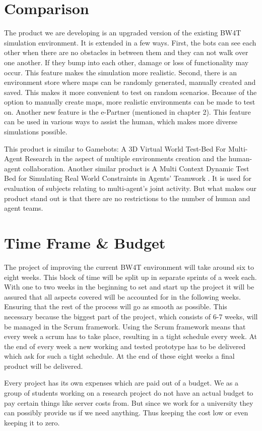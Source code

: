 \documentclass[oneside]{tudelft-report}
\begin{document}
\chapter{Comparison}
The product we are developing is an upgraded version of the existing BW4T simulation environment. It is extended in a few ways. First, the bots can see each other when there are no obstacles in between them and they can not walk over one another. If they bump into each other, damage or loss of functionality may occur. This feature makes the simulation more realistic. Second, there is an environment store where maps can be randomly generated, manually created and saved. This makes it more convenient to test on random scenarios. Because of the option to manually create maps, more realistic environments can be made to test on. Another new feature is the e-Partner (mentioned in chapter 2). This feature can be used in various ways to assist the human, which makes more diverse simulations possible.

This product is similar to Gamebots: A 3D Virtual World Test-Bed For Multi-Agent Research \cite{adobbati2001gamebots} in the aspect of multiple environments creation and the human-agent collaboration. Another similar product is A Multi Context Dynamic Test Bed for Simulating Real World Constraints in Agents' Teamwork \cite{salehi2012multi}. It is used for evaluation of subjects relating to multi-agent's joint activity. But what makes our product stand out is that there are no restrictions to the number of human and agent teams.

\chapter{Time Frame \& Budget}
The project of improving the current BW4T environment will take around six to eight weeks. This block of time will be split up in separate sprints of a week each. With one to two weeks in the beginning to set and start up the project it will be assured that all aspects covered will be accounted for in the following weeks.  Ensuring that the rest of the process will go as smooth as possible. This necessary because the biggest part of the project, which consists of 6-7 weeks, will be managed in the Scrum framework. Using the Scrum framework means that every week a scrum has to take place, resulting in a tight schedule every week. At the end of every week a new working and tested prototype has to be delivered which ask for such a tight schedule. At the end of these eight weeks a final product will be delivered.

Every project has its own expenses which are paid out of a budget. We as a group of students working on a research project do not have an actual budget to pay certain things like server costs from. But since we work for a university they can possibly provide us if we need anything. Thus keeping the cost low or even keeping it to zero.




\clearpage

\end{document}
